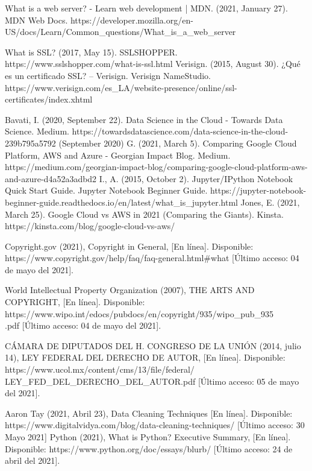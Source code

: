 \documentclass[12pt, a4paper, titlepage]{report}
\begin{document}
\begin{thebibliography}{20}
	What is a web server? - Learn web development | MDN. (2021, January 27). MDN Web Docs. https://developer.mozilla.org/en-US/docs/Learn/Common\_questions/What\_is\_a\_web\_server
	
	What is SSL? (2017, May 15). SSLSHOPPER. https://www.sslshopper.com/what-is-ssl.html
	Verisign. (2015, August 30). ¿Qué es un certificado SSL? – Verisign. Verisign NameStudio. https://www.verisign.com/es\_LA/website-presence/online/ssl-certificates/index.xhtml
	
	Bavati, I. (2020, September 22). Data Science in the Cloud - Towards Data Science. Medium. https://towardsdatascience.com/data-science-in-the-cloud-239b795a5792 (September 2020)
	G. (2021, March 5). Comparing Google Cloud Platform, AWS and Azure - Georgian Impact Blog. Medium. https://medium.com/georgian-impact-blog/comparing-google-cloud-platform-aws-and-azure-d4a52a3adbd2
	I., A. (2015, October 2). Jupyter/IPython Notebook Quick Start Guide. Jupyter Notebook Beginner Guide. https://jupyter-notebook-beginner-guide.readthedocs.io/en/latest/what\_is\_jupyter.html
	Jones, E. (2021, March 25). Google Cloud vs AWS in 2021 (Comparing the Giants). Kinsta. https://kinsta.com/blog/google-cloud-vs-aws/
	
	Copyright.gov (2021), Copyright in General, [En línea]. Disponible: https://www.copyright.gov/help/faq/faq-general.html\#what [Último acceso: 04 de mayo del 2021].
	
	World Intellectual Property Organization (2007), THE ARTS AND COPYRIGHT, [En línea]. Disponible: https://www.wipo.int/edocs/pubdocs/en/copyright/935/wipo\_pub\_935\\.pdf [Último acceso: 04 de mayo del 2021].
	
	CÁMARA DE DIPUTADOS DEL H. CONGRESO DE LA UNIÓN (2014, julio 14), LEY FEDERAL DEL DERECHO DE AUTOR, [En línea]. Disponible: https://www.ucol.mx/content/cms/13/file/federal/\\LEY\_FED\_DEL\_DERECHO\_DEL\_AUTOR.pdf [Último acceso: 05 de mayo del 2021].
	
	Aaron Tay (2021, Abril 23), Data Cleaning Techniques [En línea]. Disponible: https://www.digitalvidya.com/blog/data-cleaning-techniques/ [Último acceso: 30 Mayo 2021]
	Python (2021), What is Python? Executive Summary, [En línea]. Disponible: https://www.python.org/doc/essays/blurb/ [Último acceso: 24 de abril del 2021].
	

\end{thebibliography}
\end{document}

